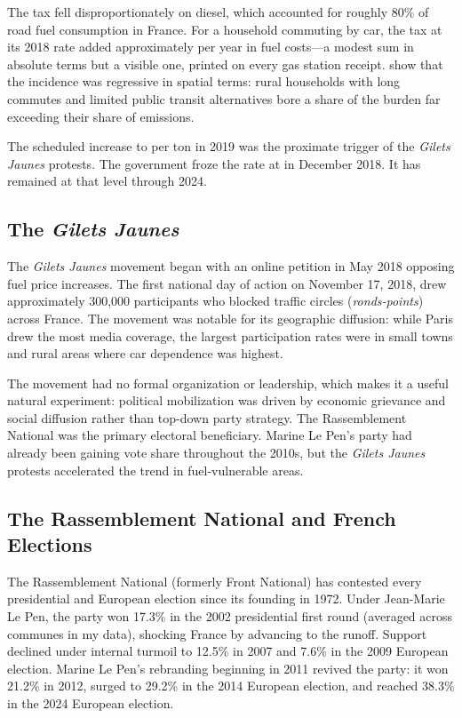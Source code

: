 \documentclass[12pt]{article}
\providecommand{\euro}{\texteuro}
\newcommand{\rn}{Rassemblement National}
\newcommand{\fn}{Front National}
\newcommand{\gj}{\textit{Gilets Jaunes}}
\begin{document}
The tax fell disproportionately on diesel, which accounted for roughly 80\% of road fuel consumption in France. For a household commuting by car, the tax at its 2018 rate added approximately \euro 120 per year in fuel costs---a modest sum in absolute terms but a visible one, printed on every gas station receipt. \citet{bureau2019distributional} show that the incidence was regressive in spatial terms: rural households with long commutes and limited public transit alternatives bore a share of the burden far exceeding their share of emissions.

The scheduled increase to \euro 55 per ton in 2019 was the proximate trigger of the \gj{} protests. The government froze the rate at \euro 44.60 in December 2018. It has remained at that level through 2024.

\subsection{The \textit{Gilets Jaunes}}

The \gj{} movement began with an online petition in May 2018 opposing fuel price increases. The first national day of action on November 17, 2018, drew approximately 300,000 participants who blocked traffic circles (\textit{ronds-points}) across France. The movement was notable for its geographic diffusion: while Paris drew the most media coverage, the largest participation rates were in small towns and rural areas where car dependence was highest.

The movement had no formal organization or leadership, which makes it a useful natural experiment: political mobilization was driven by economic grievance and social diffusion rather than top-down party strategy. The \rn{} was the primary electoral beneficiary. Marine Le Pen's party had already been gaining vote share throughout the 2010s, but the \gj{} protests accelerated the trend in fuel-vulnerable areas.

\subsection{The \rn{} and French Elections}

The \rn{} (formerly \fn{}) has contested every presidential and European election since its founding in 1972. Under Jean-Marie Le Pen, the party won 17.3\% in the 2002 presidential first round (averaged across communes in my data), shocking France by advancing to the runoff. Support declined under internal turmoil to 12.5\% in 2007 and 7.6\% in the 2009 European election. Marine Le Pen's rebranding beginning in 2011 revived the party: it won 21.2\% in 2012, surged to 29.2\% in the 2014 European election, and reached 38.3\% in the 2024 European election.
\end{document}
